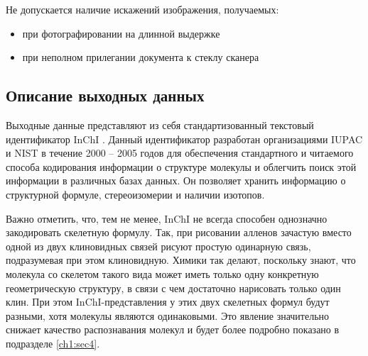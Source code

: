 Не допускается наличие искажений изображения, получаемых:

\begin{itemize}
	\item при фотографировании на длинной выдержке
	\item при неполном прилегании документа к стеклу сканера
\end{itemize}

\subsection{Описание выходных данных}
Выходные данные представляют из себя стандартизованный текстовый идентификатор InChI \cite{inchi_trust, inchi_wiki}. Данный идентификатор разработан организациями IUPAC и NIST в течение 2000 -- 2005 годов для обеспечения стандартного и читаемого способа кодирования информации о структуре молекулы и облегчить поиск этой информации в различных базах данных. Он позволяет хранить информацию о структурной формуле, стереоизомерии и наличии изотопов.

Важно отметить, что, тем не менее, InChI не всегда способен однозначно закодировать скелетную формулу. Так, при рисовании алленов зачастую вместо одной из двух клиновидных связей рисуют простую одинарную связь, подразумевая при этом клиновидную. Химики так делают, поскольку знают, что молекула со скелетом такого вида может иметь только одну конкретную геометрическую структуру, в связи с чем достаточно нарисовать только один клин. При этом InChI-представления у этих двух скелетных формул будут разными, хотя молекулы являются одинаковыми. Это явление значительно снижает качество распознавания молекул и будет более подробно показано в подразделе \ref{ch1:sec4}.

